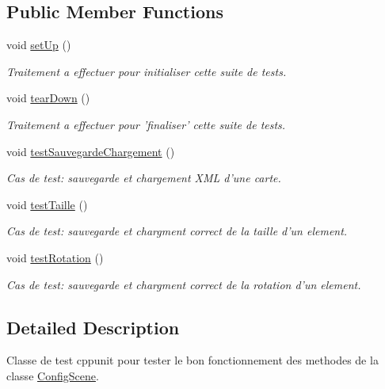 \subsection*{Public Member Functions}
\begin{DoxyCompactItemize}
\item 
void \hyperlink{group__inf2990_ga707d7400843047e67b736ab79bafb5a0}{set\-Up} ()
\begin{DoxyCompactList}\small\item\em Traitement a effectuer pour initialiser cette suite de tests. \end{DoxyCompactList}\item 
void \hyperlink{group__inf2990_ga889ed3891c3e55280cabb982953906d9}{tear\-Down} ()
\begin{DoxyCompactList}\small\item\em Traitement a effectuer pour 'finaliser' cette suite de tests. \end{DoxyCompactList}\item 
void \hyperlink{group__inf2990_ga0f09d52bc30d87f18b0341e1052efb74}{test\-Sauvegarde\-Chargement} ()
\begin{DoxyCompactList}\small\item\em Cas de test\-: sauvegarde et chargement X\-M\-L d'une carte. \end{DoxyCompactList}\item 
\hypertarget{group__inf2990_gac6b0ce9867809f3caab1e8f0a3d1a54a}{void \hyperlink{group__inf2990_gac6b0ce9867809f3caab1e8f0a3d1a54a}{test\-Taille} ()}\label{group__inf2990_gac6b0ce9867809f3caab1e8f0a3d1a54a}

\begin{DoxyCompactList}\small\item\em Cas de test\-: sauvegarde et chargment correct de la taille d'un element. \end{DoxyCompactList}\item 
\hypertarget{group__inf2990_gab62faa9bff39bff7feb25dffda78c21a}{void \hyperlink{group__inf2990_gab62faa9bff39bff7feb25dffda78c21a}{test\-Rotation} ()}\label{group__inf2990_gab62faa9bff39bff7feb25dffda78c21a}

\begin{DoxyCompactList}\small\item\em Cas de test\-: sauvegarde et chargment correct de la rotation d'un element. \end{DoxyCompactList}\end{DoxyCompactItemize}


\subsection{Detailed Description}
Classe de test cppunit pour tester le bon fonctionnement des methodes de la classe \hyperlink{class_config_scene}{Config\-Scene}. 

